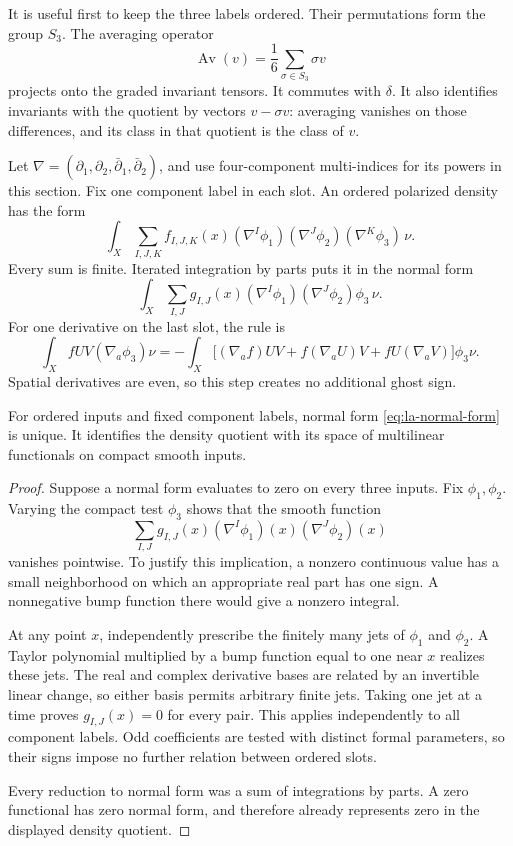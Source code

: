 It is useful first to keep the three labels ordered. Their
permutations form the group $S_3$. The averaging operator
\[
 \operatorname{Av}(v)=\frac16\sum_{\sigma\in S_3}\sigma v
\]
projects onto the graded invariant tensors. It commutes with
$\delta$. It also identifies invariants with the quotient by
vectors $v-\sigma v$: averaging vanishes on those differences,
and its class in that quotient is the class of $v$.

Let $\nabla=(\partial_1,\partial_2,
\bar\partial_1,\bar\partial_2)$, and use four-component
multi-indices for its powers in this section. Fix one component
label in each slot. An ordered polarized density has the form
\[
 \int_X\sum_{I,J,K}f_{I,J,K}(x)
       (\nabla^I\phi_1)(\nabla^J\phi_2)
                         (\nabla^K\phi_3)\,\nu.
\]
Every sum is finite. Iterated integration by parts puts it in
the normal form
\begin{equation}\label{eq:la-normal-form}
 \int_X\sum_{I,J}g_{I,J}(x)
       (\nabla^I\phi_1)(\nabla^J\phi_2)\phi_3\,\nu.
\end{equation}
For one derivative on the last slot, the rule is
\[
 \int_X fU V(\nabla_a\phi_3)\nu
 =-\int_X\bigl[(\nabla_af)UV
               +f(\nabla_aU)V+fU(\nabla_aV)\bigr]\phi_3\nu.
\]
Spatial derivatives are even, so this step creates no additional
ghost sign.

\begin{lemma}\label{lem:la-normal-unique}
For ordered inputs and fixed component labels, normal form
\eqref{eq:la-normal-form} is unique. It identifies the density
quotient with its space of multilinear functionals on compact
smooth inputs.
\end{lemma}
\begin{proof}
Suppose a normal form evaluates to zero on every three inputs.
Fix $\phi_1,\phi_2$. Varying the compact test $\phi_3$ shows that
the smooth function
\[
 \sum_{I,J}g_{I,J}(x)
          (\nabla^I\phi_1)(x)(\nabla^J\phi_2)(x)
\]
vanishes pointwise. To justify this implication, a nonzero
continuous value has a small neighborhood on which an
appropriate real part has one sign. A nonnegative bump
function there would give a nonzero integral.

At any point $x$, independently prescribe the finitely many
jets of $\phi_1$ and $\phi_2$. A Taylor polynomial multiplied
by a bump function equal to one near $x$ realizes these jets.
The real and complex derivative bases are related by an
invertible linear change, so either basis permits arbitrary
finite jets. Taking one jet at a time proves
$g_{I,J}(x)=0$ for every pair. This applies independently to
all component labels. Odd coefficients are tested with distinct
formal parameters, so their signs impose no further relation
between ordered slots.

Every reduction to normal form was a sum of integrations by
parts. A zero functional has zero normal form, and therefore
already represents zero in the displayed density quotient.
\end{proof}

